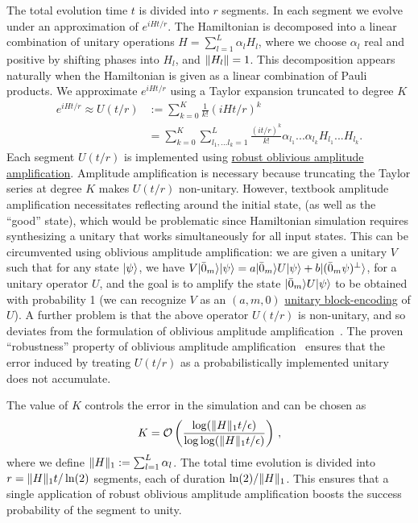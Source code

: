 \begin{refsection}
The total evolution time $t$ is divided into $r$ segments. In each segment we evolve under an approximation of $e^{iHt/r}$. The Hamiltonian is decomposed into a linear combination of unitary operations $H = \sum_{l=1}^L \alpha_l H_l$, where we choose $\alpha_l$ real and positive by shifting phases into $H_l$, and $\lVert H_l\rVert=1$. This decomposition appears naturally when the Hamiltonian is given as a linear combination of Pauli products. We approximate $e^{iHt/r}$ using a Taylor expansion truncated to degree $K$
\begin{align}
e^{iHt/r} \approx U(t/r) &:= \sum_{k=0}^K \frac{1}{k!} (iHt/r)^k \\ \nonumber
&=\sum_{k=0}^K \sum_{l_1, ... l_k=1}^L \frac{(it/r)^k}{k!} \alpha_{l_1} ... \alpha_{l_k} H_{l_1} ... H_{l_k}.
\end{align}
Each segment $U(t/r)$ is implemented using \hyperref[prim:AA]{robust oblivious amplitude amplification}. Amplitude amplification is necessary because truncating the Taylor series at degree $K$ makes $U(t/r)$ non-unitary. However, textbook amplitude amplification necessitates reflecting around the initial state, (as well as the ``good'' state), which would be problematic since Hamiltonian simulation requires synthesizing a unitary that works simultaneously for all input states. This can be circumvented using oblivious amplitude amplification: we are given a unitary $V$ such that for any state $\lvert\psi\rangle$, we have $V \lvert\bar{0}_m\rangle \lvert\psi\rangle = a \lvert\bar{0}_m\rangle U \lvert\psi\rangle + b \lvert(\bar{0}_m \psi)^\perp\rangle$, for a unitary operator $U$, and the goal is to amplify the state $\lvert\bar{0}_m\rangle U \lvert\psi\rangle$ to be obtained with probability 1 (we can recognize $V$ as an $(a, m, 0)$ \hyperref[prim:BlockEncodings]{unitary block-encoding} of $U$). A further problem is that the above operator $U(t/r)$ is non-unitary, and so deviates from the formulation of oblivious amplitude amplification~\cite{berry2013ExpPrecHamSimSTOC}. The proven ``robustness'' property of oblivious amplitude amplification~\cite{berry2014HamSimTaylor} ensures that the error induced by treating $U(t/r)$ as a probabilistically implemented unitary does not accumulate.

The value of $K$ controls the error in the simulation and can be chosen as 
\begin{equation}
    K=\mathcal{O}\left(  \frac{\log(\lVert H\rVert_1 t /\epsilon)}{ \log\log(\lVert H\rVert_1 t / \epsilon )} \right)\,,
\end{equation}
where we define 
$\lVert H\rVert_1: = \sum_{l=1}^L \alpha_l$. The total time evolution is divided into $r = \lVert H\rVert_1 t / \ln(2)$ segments, each of duration $\ln(2) / \lVert H\rVert_1 $. This ensures that a single application of robust oblivious amplitude amplification boosts the success probability of the segment to unity. 


\end{refsection}
